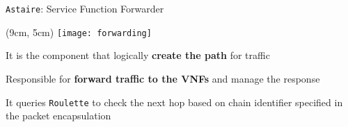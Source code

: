 \begin{frame}{\texttt{Astaire}: Service Function Forwarder}

  \begin{textblock*}{1cm}(9cm, 5cm)
    \texttt{[image: forwarding]}
  \end{textblock*}

  It is the component that logically \textbf{create the path} for traffic

  \vfill{}

  Responsible for \textbf{forward traffic to the VNFs} and manage the response

  \vfill{}

  It queries \texttt{Roulette} to check the next hop based on chain identifier
  specified in the packet encapsulation

\end{frame}